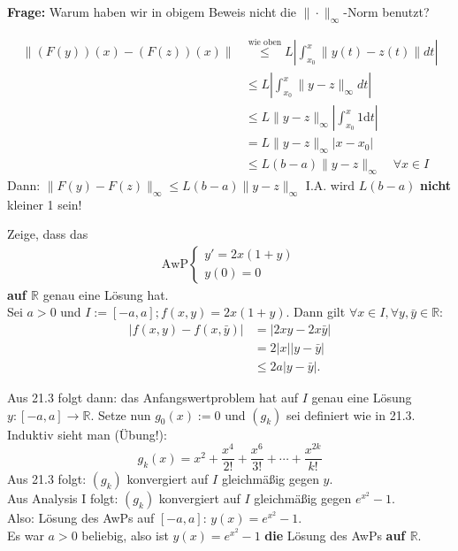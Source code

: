 \documentclass[a4paper,oneside,DIV15,BCOR12mm,chapterprefix=true,headings=onelinechapter]{scrbook}
\begin{document}
\textbf{Frage: } Warum haben wir in obigem Beweis nicht die $\|\cdot \|_\infty$-Norm benutzt?

\begin{align*}
\|(F(y))(x) -(F(z))(x)\| &\stackrel{\text{wie oben}}\leq L \left| \int_{x_0}^x \|y(t)-z(t)\| dt \right| \\
&\leq L \left| \int_{x_0}^x \|y-z\|_\infty dt \right| \\
&\leq L \|y-z\|_\infty \left| \int_{x_0}^x 1 \text{d}t \right|\\
&= L \|y-z\|_\infty |x-x_0|\\
&\leq L(b-a) \|y-z\|_\infty \quad \forall x \in I
\end{align*}
Dann:  $\|F(y)-F(z)\|_\infty \leq L(b-a)\|y-z\|_\infty$
I.A. wird $L(b-a)$ \textbf{nicht} kleiner 1 sein!


\begin{beispiel}[zu 21.3]
Zeige, dass das
\begin{align*}
\text{AwP}
\begin{cases}
y' = 2x(1+y)\\
y(0) =  0
\end{cases} \end{align*}
\textbf{auf $\mathbb{R}$} genau eine Lösung hat.\\
Sei $a > 0$ und $I := [-a, a]; f(x,y) = 2x(1+y).$ Dann gilt $\forall x \in I, \forall y, \bar y \in \mathbb{R}:$
\begin{align*}
|f(x,y)-f(x, \bar y )|&= |2xy-2x\bar y | \\
&= 2|x||y-\bar y | \\
&\leq 2a|y-\bar y |.
\end{align*}

Aus 21.3 folgt dann: das Anfangswertproblem hat auf $I$ genau eine Lösung $y: [-a, a] \to \mathbb{R}$. 
Setze nun $g_0(x) :=0$ und $(g_k)$  sei definiert wie in 21.3.
Induktiv sieht man (Übung!):
\[g_k(x) = x^2 + \frac{x^4}{2!} + \frac{x^6}{3!} + \cdots + \frac{x^{2k}}{k!} \]
Aus 21.3 folgt: $(g_k)$ konvergiert auf $I$ gleichmäßig gegen $y$.\\
Aus Analysis I folgt: $(g_k)$ konvergiert auf $I$ gleichmäßig gegen $e^{x^2} - 1$.\\
Also: Lösung des AwPs auf $[-a,a]$: $y(x) = e^{x^2} -1$.\\
Es war $a > 0$ beliebig, also ist $y(x) = e^{x^2} -1$ \textbf{die} Lösung des AwPs \textbf{auf $\mathbb{R}$}.
\end{beispiel}
\end{document}
